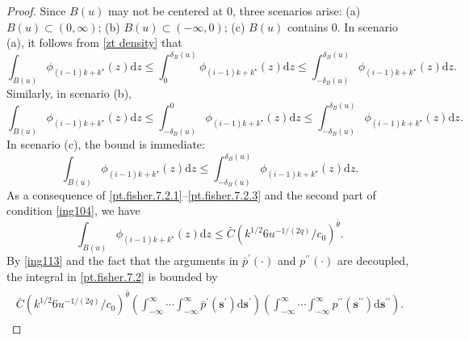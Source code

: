 \documentclass[ejsv2]{imsart}
\theoremstyle{plain}
\theoremstyle{definition}
\theoremstyle{remark}
\begin{document}
\begin{proof}
Since $B(u)$ may not be centered at 0,
three scenarios arise: (a) $B(u)\subset(0,\infty)$; (b) $B(u)\subset (-\infty,0)$; (c) $B(u)$ contains 0. In scenario (a), it follows from \eqref{zt density} that
\begin{equation}\label{pt.fisher.7.2.1}
\int_{B(u)}\phi_{(i-1)k+k^{\star}}(z)\mathrm{d}z\leq \int_{0}^{\delta_B(u)}\phi_{(i-1)k+k^{\star}}(z)\mathrm{d}z\leq \int_{-\delta_B(u)}^{\delta_B(u)}\phi_{(i-1)k+k^{\star}}(z)\mathrm{d}z.
\end{equation}
Similarly, in scenario (b),
\begin{equation}\label{pt.fisher.7.2.2}
\int_{B(u)}\phi_{(i-1)k+k^{\star}}(z)\mathrm{d}z\leq \int_{-\delta_B(u)}^{0}\phi_{(i-1)k+k^{\star}}(z)\mathrm{d}z\leq \int_{-\delta_B(u)}^{\delta_B(u)}\phi_{(i-1)k+k^{\star}}(z)\mathrm{d}z.
\end{equation}
In scenario (c), the bound is immediate:
\begin{equation}\label{pt.fisher.7.2.3}
\int_{B(u)}\phi_{(i-1)k+k^{\star}}(z)\mathrm{d}z\leq \int_{-\delta_B(u)}^{\delta_B(u)}\phi_{(i-1)k+k^{\star}}(z)\mathrm{d}z.
\end{equation}
As a consequence of \eqref{pt.fisher.7.2.1}--\eqref{pt.fisher.7.2.3} and the second part of condition \eqref{ing104}, we have
\begin{equation}\label{ing113}
\int_{B(u)}\phi_{(i-1)k+k^{\star}}(z)\mathrm{d}z\leq \bar{C}(k^{1/2}6u^{-1/(2q)}/c_0)^{\bar{\theta}}.
\end{equation}
By \eqref{ing113} and the fact that the arguments 
in $\bar{p}^{\prime}(\cdot)$
and $p^{\prime\prime}(\cdot)$ are decoupled, 
the integral in 
\eqref{pt.fisher.7.2} is bounded by
\begin{align}
\label{ing250610}
\begin{split}
\bar{C}(k^{1/2}6u^{-1/(2q)}/c_0)^{\bar{\theta}} 
\left(\int_{-\infty}^{\infty}\cdots\int_{-\infty}^{\infty}
 \bar{p}^{\prime}(\mathbf{s}^\prime)\mathrm{d}\mathbf{s}^{\prime} \right)
 \left(\int_{-\infty}^{\infty}\cdots\int_{-\infty}^{\infty}
p^{\prime\prime}(\mathbf{s}^{\prime\prime}) \mathrm{d}\mathbf{s}^{\prime\prime}\right).
\end{split}
\end{align}



\end{proof}
\end{document}
